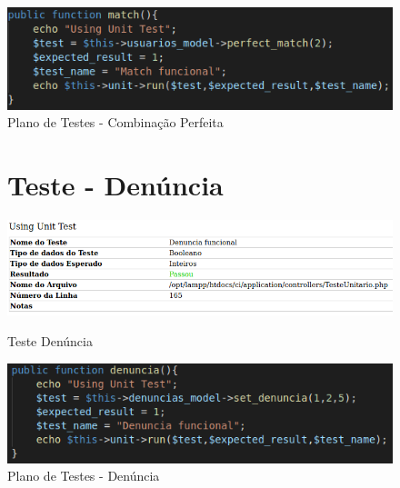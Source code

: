 \begin{apendicesenv}
\begin{figure}[htb]
    \centering
    \caption{\label{fig_timeline}Plano de Testes - Combinação Perfeita}
	\includegraphics[width=1\textwidth]{imagens/cod_teste_match.png}
\end{figure}

\begin{figure}[!htbp]
\begin{flushleft}
    \section{Teste - Denúncia}
\end{flushleft}
    \centering
    \caption{Teste Denúncia}
    \includegraphics[width=1\textwidth,pagecommand=\chapter{}]{imagens/teste_denuncia.png}
    \label{teste-denuncia}
\end{figure}

\begin{figure}[htb]
    \centering
    \caption{\label{fig_timeline}Plano de Testes - Denúncia}
	\includegraphics[width=1\textwidth]{imagens/cod_teste_denuncia.png}
\end{figure}


\end{apendicesenv}
